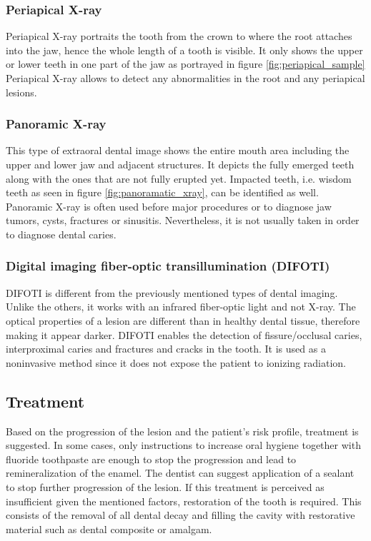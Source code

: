 \subsubsection{Periapical X-ray} 
Periapical X-ray portraits the tooth from the crown to where the root attaches into the jaw, hence the whole length of a tooth is visible. It only shows the upper or lower teeth in one part of the jaw as portrayed in figure \ref{fig:periapical_sample}  Periapical X-ray allows to detect any abnormalities in the root and any periapical lesions.

\subsubsection{Panoramic X-ray}
This type of extraoral dental image shows the entire mouth area including the upper and lower jaw and adjacent structures. It depicts the fully emerged teeth along with the ones that are not fully erupted yet. Impacted teeth, i.e. wisdom teeth as seen in figure \ref{fig:panoramatic_xray}, can be identified as well.  Panoramic X-ray is often used before major procedures or to diagnose jaw tumors, cysts, fractures or sinusitis. Nevertheless, it is not usually taken in order to diagnose dental caries.

\subsubsection{Digital imaging fiber-optic transillumination (DIFOTI)}
DIFOTI is different from the previously mentioned types of dental imaging. Unlike the others, it works with an infrared fiber-optic light and not X-ray. The optical properties of a lesion are different than in  healthy dental tissue, therefore making it appear darker. DIFOTI enables the detection of fissure/occlusal caries, interproximal caries and fractures and cracks in the tooth. It is used as a noninvasive method since it does not expose the patient to ionizing radiation. 

\subsection{Treatment}
Based on the progression of the lesion and the patient's risk profile, treatment is suggested. In some cases, only instructions to increase oral hygiene together with fluoride toothpaste are enough to stop the progression and lead to remineralization of the enamel. The dentist can suggest application of a sealant to stop further progression of the lesion. If this treatment is perceived as insufficient given the mentioned factors, restoration of the tooth is required. This consists of the removal of all dental decay and filling the cavity with restorative material such as dental composite or amalgam.

